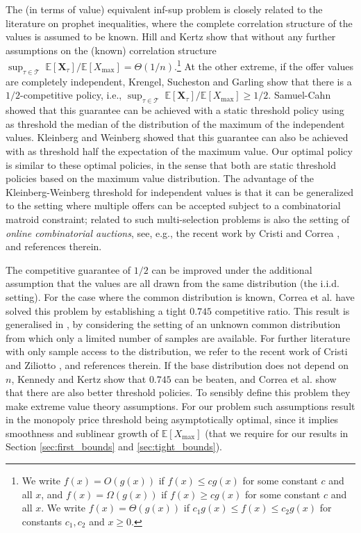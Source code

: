 \documentclass[11pt,a4paper]{article}
\numberwithin{equation}{section}
\newcommand{\E}{\mathbb{E}}
\begin{document}
The (in terms of value) equivalent inf-sup problem is closely related to the literature on prophet inequalities, where the complete correlation structure of the values is assumed to be known.
Hill and Kertz \cite{hill1983stop} show that without any further assumptions on the (known) correlation structure $\sup_{\tau\in\mathcal{T}} \; \mathbb{E}[\boldsymbol{X}_{\tau}]/\mathbb{E}[X_{\max}] = \Theta(1/n)$.\footnote{We write $f(x) = O(g(x))$ if $f(x) \leq c g(x)$ for some constant $c$ and all $x$, and $f(x) = \Omega(g(x))$ if $f(x) \geq c g(x)$ for some constant $c$ and all $x$. We write $f(x) = \Theta(g(x))$ if $c_1g(x) \leq f(x) \leq c_2g(x)$ for constants $c_1, c_2$ and $x \geq 0$.}
At the other extreme, if the offer values are completely independent, Krengel, Sucheston and Garling \cite{krengel1978semiamarts} show that there is a $1/2$-competitive policy, i.e., $\sup_{\tau\in\mathcal{T}} \; \mathbb{E}[\boldsymbol{X}_{\tau}]/\mathbb{E}[X_{\max}] \geq 1/2$.
Samuel-Cahn \cite{samuel1984comparison} showed that this guarantee can be achieved with a static threshold policy using as threshold the median of the distribution of the maximum of the independent values. Kleinberg and Weinberg \cite{kleinberg2012matroid} showed that this guarantee can also be achieved with as threshold half the expectation of the maximum value. Our optimal policy is similar to these optimal policies, in the sense that both are static threshold policies based on the maximum value distribution.
The advantage of the Kleinberg-Weinberg threshold for independent values is that it can be generalized to the setting where multiple offers can be accepted subject to a combinatorial matroid constraint; related to such multi-selection problems is also the setting of \textit{online combinatorial auctions}, see, e.g., the recent work by Cristi and Correa \cite{correa2023constant}, and references therein.


The competitive guarantee of $1/2$ can be improved under the additional assumption that the values are all drawn from the same distribution (the i.i.d. setting). For the case where the common distribution is known, Correa et al. \cite{correa2017posted} have solved this problem by establishing a tight $0.745$ competitive ratio.
This result is generalised in \cite{correa2022prophet}, by considering the setting of an unknown common distribution from which only a limited number of samples are available. For further literature with only sample access to the distribution, we refer to the recent work of Cristi and Ziliotto \cite{cristi2024prophet}, and references therein. If the base distribution does not depend on $n$, Kennedy and Kertz \cite{kennedy1991asymptotic}
show that $0.745$ can be beaten, and Correa et al. \cite{correa2021optimal} show that there are also better threshold policies.
To sensibly define this problem they make extreme value theory assumptions. 
For our problem such assumptions result in the monopoly price threshold being asymptotically optimal, since it implies smoothness and sublinear growth of $\E[X_{\max}]$ (that we require for our results in Section \ref{sec:first_bounds} and \ref{sec:tight_bounds}). 
\end{document}
